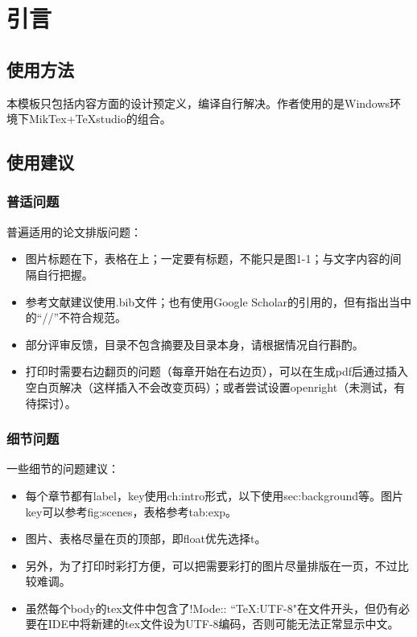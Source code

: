 \chapter{引言}


\section{使用方法}
\label{sec:usage}

本模板只包括内容方面的设计预定义，编译自行解决。作者使用的是Windows环境下MikTex+TeXstudio的组合。

\section{使用建议}
\label{sec:tips}

\subsection{普适问题}
\label{subsec:common}

普遍适用的论文排版问题：

\begin{itemize}
\item 图片标题在下，表格在上；一定要有标题，不能只是图1-1；与文字内容的间隔自行把握。
\item 参考文献建议使用.bib文件；也有使用Google Scholar的引用的，但有指出当中的“//”不符合规范。
\item 部分评审反馈，目录不包含摘要及目录本身，请根据情况自行斟酌。
\item 打印时需要右边翻页的问题（每章开始在右边页），可以在生成pdf后通过插入空白页解决（这样插入不会改变页码）；或者尝试设置openright（未测试，有待探讨）。
\end{itemize}

\subsection{细节问题}
\label{subsec:specs}

一些细节的问题建议：
\begin{itemize}
\item 每个章节都有label，key使用ch:intro形式，以下使用sec:background等。图片key可以参考fig:scenes，表格参考tab:exp。
\item 图片、表格尽量在页的顶部，即float优先选择t。
\item 另外，为了打印时彩打方便，可以把需要彩打的图片尽量排版在一页，不过比较难调。
\item 虽然每个body的tex文件中包含了!Mode:: ``TeX:UTF-8"在文件开头，但仍有必要在IDE中将新建的tex文件设为UTF-8编码，否则可能无法正常显示中文。
\end{itemize}

